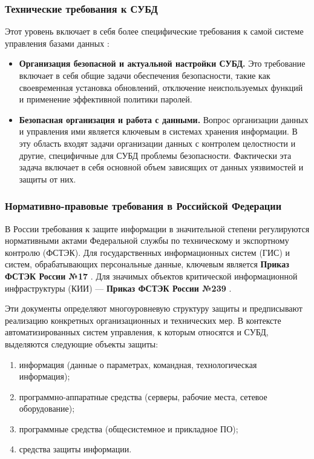 \subsubsection{Технические требования к СУБД}
Этот уровень включает в себя более специфические требования к самой системе управления базами данных \autocite{LAPA, Pirogov2009}:
\begin{itemize}
    \item \textbf{Организация безопасной и актуальной настройки СУБД.} Это требование включает в себя общие задачи обеспечения безопасности, такие как своевременная установка обновлений, отключение неиспользуемых функций и применение эффективной политики паролей.
    \item \textbf{Безопасная организация и работа с данными.} Вопрос организации данных и управления ими является ключевым в системах хранения информации. В эту область входят задачи организации данных с контролем целостности и другие, специфичные для СУБД проблемы безопасности. Фактически эта задача включает в себя основной объем зависящих от данных уязвимостей и защиты от них.
\end{itemize}

\subsubsection{Нормативно-правовые требования в Российской Федерации}
В России требования к защите информации в значительной степени регулируются нормативными актами Федеральной службы по техническому и экспортному контролю (ФСТЭК). Для государственных информационных систем (ГИС) и систем, обрабатывающих персональные данные, ключевым является \textbf{Приказ ФСТЭК России №17} \autocite{fstec17}. Для значимых объектов критической информационной инфраструктуры (КИИ) — \textbf{Приказ ФСТЭК России №239} \autocite{FSTEKOBKIS}.

Эти документы определяют многоуровневую структуру защиты и предписывают реализацию конкретных организационных и технических мер. В контексте автоматизированных систем управления, к которым относятся и СУБД, выделяются следующие объекты защиты:
\begin{enumerate}
	\item информация (данные о параметрах, командная, технологическая информация);
	\item программно-аппаратные средства (серверы, рабочие места, сетевое оборудование);
	\item программные средства (общесистемное и прикладное ПО);
	\item средства защиты информации.
\end{enumerate}

